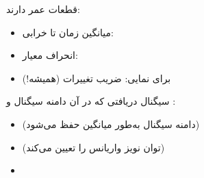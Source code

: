 
قطعات عمر  دارند:

\begin{itemize}
\tightlist
\item
  میانگین زمان تا خرابی: 
\item
  انحراف معیار: 
\item
  برای نمایی: ضریب تغییرات  (همیشه!)
\end{itemize}


سیگنال دریافتی  که در آن  دامنه سیگنال و :

\begin{itemize}
\tightlist
\item
   (دامنه سیگنال به‌طور میانگین حفظ می‌شود)
\item
   (توان نویز واریانس را تعیین می‌کند)
\item
\end{itemize}


